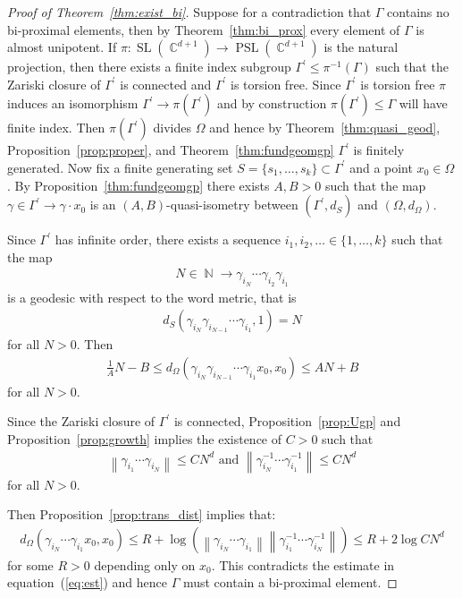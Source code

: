 \documentclass[12pt]{amsart}
\theoremstyle{plain}
\theoremstyle{definition}
\theoremstyle{remark}
\begin{document}
\begin{proof}[Proof of Theorem~\ref{thm:exist_bi}]
Suppose for a contradiction that $\Gamma$ contains no bi-proximal elements, then by Theorem~\ref{thm:bi_prox} every element of $\Gamma$ is almost unipotent. If $\pi:\operatorname{SL}(\operatorname{\mathbb{C}}^{d+1})\rightarrow \operatorname{PSL}(\operatorname{\mathbb{C}}^{d+1})$ is the natural projection, then there exists a finite index subgroup $\Gamma^{\prime} \leq \pi^{-1}(\Gamma)$ such that the Zariski closure of $\Gamma^{\prime}$ is connected and $\Gamma^\prime$ is torsion free. Since $\Gamma^\prime$ is torsion free $\pi$ induces an isomorphism $\Gamma^\prime \rightarrow \pi(\Gamma^\prime)$ and by construction $\pi(\Gamma^\prime) \leq \Gamma$ will have finite index. Then $\pi(\Gamma^\prime)$ divides $\Omega$ and hence by Theorem~\ref{thm:quasi_geod}, Proposition~\ref{prop:proper}, and Theorem~\ref{thm:fundgeomgp} $\Gamma^\prime$ is finitely generated. Now fix a finite generating set $S=\{s_1,\dots,s_k\} \subset \Gamma^\prime$ and a point $x_0 \in \Omega$. By Proposition~\ref{thm:fundgeomgp} there exists $A,B >0$ such that the map $\gamma \in \Gamma^\prime \rightarrow \gamma \cdot x_0$ is an $(A,B)$-quasi-isometry between $(\Gamma^\prime, d_S)$ and $(\Omega,d_{\Omega})$. 

Since $\Gamma^\prime$ has infinite order, there exists a sequence $i_1, i_2, \dots \in \{1,\dots, k\}$ such that the map 
\begin{align*}
N \in \operatorname{\mathbb{N}} \rightarrow \gamma_{i_N} \cdots \gamma_{i_2}\gamma_{i_1}
\end{align*}
is a geodesic with respect to the word metric, that is 
\begin{align*}
d_S(\gamma_{i_N} \gamma_{i_{N-1}} \cdots \gamma_{i_1}, 1) = N
\end{align*}
for all $N>0$. Then 
\begin{align}
\label{eq:est}
\frac{1}{A}N-B \leq d_{\Omega}(\gamma_{i_N} \gamma_{i_{N-1}} \cdots \gamma_{i_1} x_0, x_0) \leq AN+B
\end{align}
for all $N >0$. 

Since the Zariski closure of $\Gamma^\prime$ is connected, Proposition~\ref{prop:Ugp} and Proposition~\ref{prop:growth} implies the existence of $C>0$  such that 
\begin{align*}
{\left\|{\gamma_{i_1} \cdots \gamma_{i_N}}\right\|} \leq CN^d \text{ and } {\left\|{\gamma_{i_N}^{-1} \cdots \gamma_{i_1}^{-1}}\right\|} \leq CN^d
\end{align*}
for all $N>0$. 

Then Proposition~\ref{prop:trans_dist} implies that:
\begin{align*}
d_{\Omega}(\gamma_{i_N} \cdots \gamma_{i_1} x_0, x_0) \leq R + \log\left({\left\|{\gamma_{i_N} \cdots \gamma_{i_1} }\right\|}{\left\|{\gamma_{i_1}^{-1} \cdots \gamma_{i_N}^{-1} }\right\|}\right) \leq  R + 2\log CN^d
\end{align*}
for some $R >0$ depending only on $x_0$. This contradicts the estimate in equation~(\ref{eq:est}) and hence $\Gamma$ must contain a bi-proximal element.
\end{proof}
\end{document}
